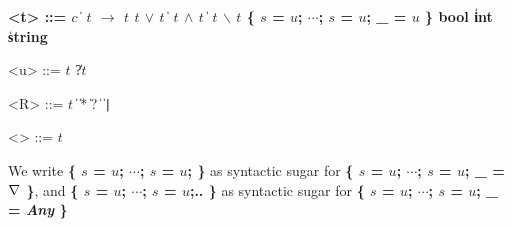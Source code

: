 \begin{grammar}
  \bfseries
  <t> ::= $c$ \| $t$ $\bm{\rightarrow}$ $t$
    \alt $t$ $\bm{\vee}$ $t$ \| $t$ $\bm{\wedge}$ $t$ \| $t$ $\bm{\backslash}$ $t$
    \alt [\meta{R}]
    \alt \{ $s$ = $u$; $\cdots{}$; $s$ = $u$; _ = $u$ \}
    \alt bool \| int \| string

  <u> ::= $t$ \| ?$t$

  <R> ::= $t$ \|  \| * \| ?
    \|   \| \texttt{|}

  <\τ> ::= $t$ %
\end{grammar}

We write \textbf{\{ $s$ = $u$; $\cdots{}$; $s$ = $u$; \}} as
syntactic sugar for \textbf{\{ $s$ = $u$; $\cdots{}$; $s$ = $u$; _ =
$\nabla$ \}}, and \textbf{\{ $s$ = $u$; $\cdots{}$; $s$ = $u$;.. \}}
as syntactic sugar for \textbf{\{ $s$ = $u$; $\cdots{}$; $s$ = $u$; _
= \textmd{\emph{Any}} \}}

